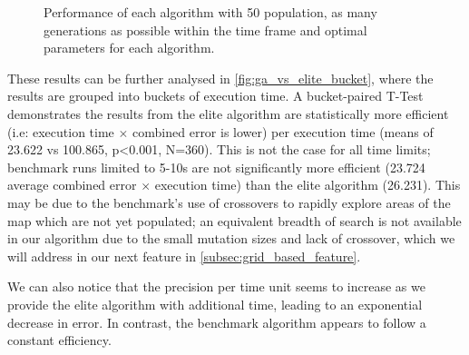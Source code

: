 \documentclass[authoryearcitations]{UoYCSproject}
\begin{document}
\begin{figure}
	\caption[Effects of elitist against tournament selection (box-plot)]{Performance of each algorithm with 50 population, as many generations as possible within the time frame and optimal parameters for each algorithm.}
	\label{fig:ga_vs_elite_box_whiskers}
\end{figure}

These results can be further analysed in \autoref{fig:ga_vs_elite_bucket}, where the results are grouped into buckets of execution time. A bucket-paired T-Test demonstrates the results from the elite algorithm are statistically more efficient (i.e: execution time $\times$ combined error is lower) per execution time (means of 23.622 vs 100.865, p<0.001, N=360). This is not the case for all time limits; benchmark runs limited to 5-10s are not significantly more efficient (23.724 average combined error $\times$ execution time) than the elite algorithm (26.231). This may be due to the benchmark's use of crossovers to rapidly explore areas of the map which are not yet populated; an equivalent breadth of search is not available in our algorithm due to the small mutation sizes and lack of crossover, which we will address in our next feature in \autoref{subsec:grid_based_feature}. \newline

We can also notice that the precision per time unit seems to increase as we provide the elite algorithm with additional time, leading to an exponential decrease in error. In contrast, the benchmark algorithm appears to follow a constant efficiency. 
\end{document}

